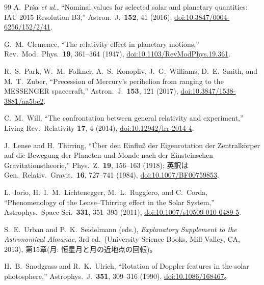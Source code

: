 \documentclass[a4paper,10pt,twocolumn]{ltjsarticle}
\begin{document}
\begin{thebibliography}{99}
A.~Pr\v{s}a \emph{et al.}, ``Nominal values for selected solar and
planetary quantities: IAU 2015 Resolution B3,''
Astron.\ J.\ \textbf{152}, 41 (2016),
\href{https://doi.org/10.3847/0004-6256/152/2/41}
{doi:10.3847/0004-6256/152/2/41}.

G.~M.~Clemence, ``The relativity effect in planetary motions,''
Rev.\ Mod.\ Phys.\ \textbf{19}, 361--364 (1947),
\href{https://doi.org/10.1103/RevModPhys.19.361}
{doi:10.1103/RevModPhys.19.361}.

R.~S.~Park, W.~M.~Folkner, A.~S.~Konopliv, J.~G.~Williams,
D.~E.~Smith, and M.~T.~Zuber, ``Precession of Mercury's perihelion
from ranging to the MESSENGER spacecraft,''
Astron.\ J.\ \textbf{153}, 121 (2017),
\href{https://doi.org/10.3847/1538-3881/aa5be2}
{doi:10.3847/1538-3881/aa5be2}.

C.~M.~Will, ``The confrontation between general relativity and
experiment,'' Living Rev.\ Relativity \textbf{17}, 4 (2014),
\href{https://doi.org/10.12942/lrr-2014-4}{doi:10.12942/lrr-2014-4}.

J.~Lense and H.~Thirring, ``\"Uber den Einflu\ss{} der Eigenrotation
der Zentralk\"orper auf die Bewegung der Planeten und Monde nach der
Einsteinschen Gravitationstheorie,''
Phys.\ Z.\ \textbf{19}, 156--163 (1918); 英訳は
Gen.\ Relativ.\ Gravit.\ \textbf{16}, 727--741 (1984),
\href{https://doi.org/10.1007/BF00759853}{doi:10.1007/BF00759853}.

L.~Iorio, H.~I.~M.~Lichtenegger, M.~L.~Ruggiero, and C.~Corda,
``Phenomenology of the Lense--Thirring effect in the Solar System,''
Astrophys.\ Space Sci.\ \textbf{331}, 351--395 (2011),
\href{https://doi.org/10.1007/s10509-010-0489-5}
{doi:10.1007/s10509-010-0489-5}.

S.~E.~Urban and P.~K.~Seidelmann (eds.), \emph{Explanatory Supplement
to the Astronomical Almanac}, 3rd ed.\ (University Science Books,
Mill Valley, CA, 2013), 第15章(月: 恒星月と月の近地点の回転)。

H.~B.~Snodgrass and R.~K.~Ulrich, ``Rotation of Doppler features in
the solar photosphere,'' Astrophys.\ J.\ \textbf{351}, 309--316
(1990),
\href{https://doi.org/10.1086/168467}{doi:10.1086/168467}。


\end{thebibliography}
\end{document}
